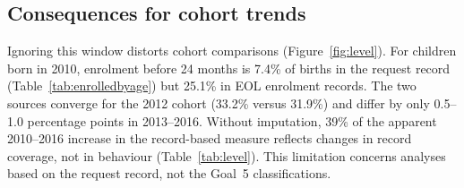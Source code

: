 \subsection{Consequences for cohort trends}\label{sec:naive}

Ignoring this window distorts cohort comparisons (Figure~\ref{fig:level}). For children born in 2010, enrolment before 24 months is 7.4\% of births in the request record (Table~\ref{tab:enrolledbyage}) but 25.1\% in EOL enrolment records. The two sources converge for the 2012 cohort (33.2\% versus 31.9\%) and differ by only 0.5--1.0 percentage points in 2013--2016. Without imputation, 39\% of the apparent 2010--2016 increase in the record-based measure reflects changes in record coverage, not in behaviour (Table~\ref{tab:level}). This limitation concerns analyses based on the request record, not the Goal~5 classifications.
